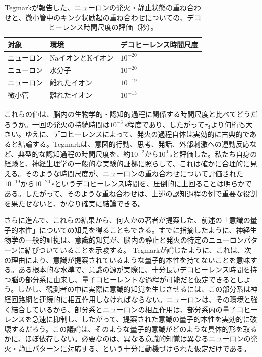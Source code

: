 \begin{table}[htbp]
\centering
\caption{Tegmark\cite{ref515}が報告した、ニューロンの発火・静止状態の重ね合わせと、微小管中のキンク状励起の重ね合わせについての、デコヒーレンス時間尺度の評価（秒）。}
\begin{tabular}{lll}\hline
対象&環境&デコヒーレンス時間尺度\\\hline
ニューロン&NaイオンとKイオン&$10^{-20}$\\
ニューロン&水分子&$10^{-20}$\\
ニューロン&離れたイオン&$10^{-19}$\\
微小管&離れたイオン&$10^{-13}$\\\hline
\end{tabular}
\end{table}

これらの値は、脳内の生物学的・認知的過程に関係する時間尺度と比べてどうだろうか。一回の発火の持続時間は$10^{-3}\,\mathrm s$程度であり、したがって$\tau_{\mathrm d}$より何桁も大きい。ゆえに、デコヒーレンスによって、発火の過程自体は実効的に古典的であると結論する。Tegmarkは、意図的行動、思考、発話、外部刺激への運動反応など、典型的な認知過程の時間尺度を、約$10^{-2}$から$10^0\,\mathrm s$と評価した。私たち自身の経験と、神経生理学の一般的な実験的証拠に照らして、これは確かに合理的に見える。そのような時間尺度が、ニューロンの重ね合わせについて評価された$10^{-19}$から$10^{-20}\,\mathrm s$というデコヒーレンス時間を、圧倒的に上回ることは明らかである。したがって、そのような重ね合わせは、上述の認知過程の例で重要な役割を果たせないと、かなり確実に結論できる。

さらに進んで、これらの結果から、何人かの著者が提案した、前述の「意識の量子的本性」についての知見を得ることもできる。すでに指摘したように、神経生物学の一般的証拠は、意識的知覚が、脳内の静止と発火の特定のニューロンパターンに結びついていることを示唆する。
\hypertarget{srcpage:371}{}\label{srcpage:371}
Tegmark\cite{ref515}が論じたように、これは、次の理由により、意識が提案されているような量子的本性を持てないことを意味する。ある根本的な水準で、意識の源が実際に、十分長いデコヒーレンス時間を持つ脳の部分系に由来し、量子コヒーレントな過程が可能だと仮定できるとしよう。しかし、観測者の中に実際に意識的知覚を生じさせるには、この部分系は神経回路網と連続的に相互作用しなければならない。ニューロンは、その環境と強く結合しているから、部分系とニューロンの相互作用は、部分系内の量子コヒーレンスを急速に抑制し、したがって、提案された意識の量子的本性を実効的に破壊するだろう。この議論は、そのような量子的意識がどのような具体的形を取るかに、ほぼ依存しない。必要なのは、異なる意識的知覚は異なるニューロンの発火・静止パターンに対応する、という十分に動機づけられた仮定だけである。

